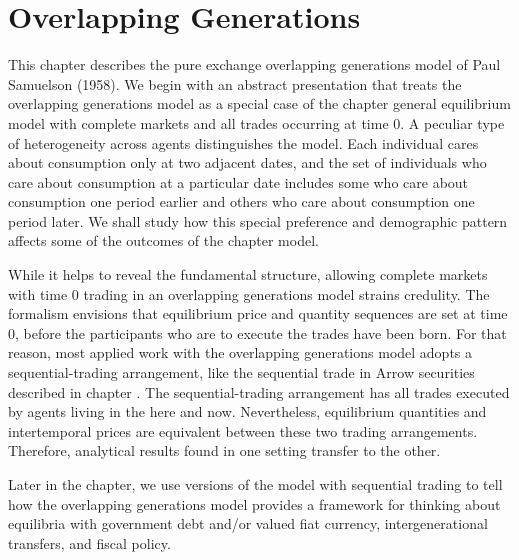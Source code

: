 

%




\def\toone{{t+1}}
\def\ttwo{{t+2}}
\def\tthree{{t+3}}
\def\Tone{{T+1}}
\def\TTT{{T-1}}
\def\rtr{{\rm tr}}
\def\tone{{t+1}}



\chapter{Overlapping Generations\label{ogmodels}}

This chapter describes the pure exchange overlapping generations
model of Paul Samuelson (1958).
 We begin with an
abstract presentation  that treats the overlapping
generations model as a special case of the chapter 
general equilibrium model with complete markets and all
trades occurring at time $0$.
A peculiar type of heterogeneity across
agents distinguishes the model.
Each individual
cares about consumption only at  two adjacent dates, and the set of
individuals who care about consumption at a particular date
includes some who care about consumption one period earlier and others
who care about consumption one period later.   We shall study
how  this
special preference and demographic  pattern affects some
of the outcomes of the chapter  model.

  While it  helps to reveal the fundamental structure, allowing
complete markets with time $0$ trading in
an overlapping generations model strains
credulity.
The formalism envisions that equilibrium price and quantity sequences
are set at time $0$,
before the participants who are to execute the trades have been born.
  For that reason, most applied work with the overlapping generations
model adopts a sequential-trading arrangement, like
the sequential trade in Arrow securities described   in chapter
.
The sequential-trading arrangement has all trades
executed by agents living in the here and now.
Nevertheless, equilibrium quantities and intertemporal prices
are  equivalent between these  two trading arrangements.
Therefore, analytical results found in one
setting transfer to the other.


Later in the chapter,
  we use versions of the model with
sequential trading  to tell how the overlapping
generations model provides  a framework for thinking about equilibria
with government debt and/or valued fiat currency, intergenerational
transfers, and fiscal policy.

